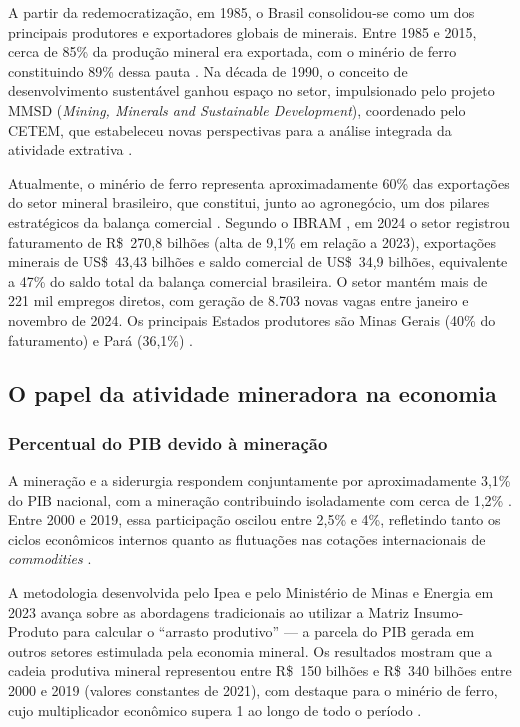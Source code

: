 A partir da redemocratização, em 1985, o Brasil consolidou-se como um dos principais produtores e exportadores globais de minerais. Entre 1985 e 2015, cerca de 85\% da produção mineral era exportada, com o minério de ferro constituindo 89\% dessa pauta \cite{fernandes2016}. Na década de 1990, o conceito de desenvolvimento sustentável ganhou espaço no setor, impulsionado pelo projeto MMSD (\textit{Mining, Minerals and Sustainable Development}), coordenado pelo CETEM, que estabeleceu novas perspectivas para a análise integrada da atividade extrativa \cite{barreto2001}.

Atualmente, o minério de ferro representa aproximadamente 60\% das exportações do setor mineral brasileiro, que constitui, junto ao agronegócio, um dos pilares estratégicos da balança comercial \cite{anm2023}. Segundo o IBRAM \citeyear{ibram2024}, em 2024 o setor registrou faturamento de R\$~270,8 bilhões (alta de 9,1\% em relação a 2023), exportações minerais de US\$~43,43 bilhões e saldo comercial de US\$~34,9 bilhões, equivalente a 47\% do saldo total da balança comercial brasileira. O setor mantém mais de 221 mil empregos diretos, com geração de 8.703 novas vagas entre janeiro e novembro de 2024. Os principais Estados produtores são Minas Gerais (40\% do faturamento) e Pará (36,1\%) \cite{ibram2024}.

\subsection{O papel da atividade mineradora na economia}
\label{subsec:papel_mineracao_economia}

\subsubsection{Percentual do PIB devido à mineração}
\label{subsubsec:percentual_pib}

A mineração e a siderurgia respondem conjuntamente por aproximadamente 3,1\% do PIB nacional, com a mineração contribuindo isoladamente com cerca de 1,2\% \cite{apc2024}. Entre 2000 e 2019, essa participação oscilou entre 2,5\% e 4\%, refletindo tanto os ciclos econômicos internos quanto as flutuações nas cotações internacionais de \textit{commodities} \cite{leao2023, ipea2023, apc2024}.

A metodologia desenvolvida pelo Ipea e pelo Ministério de Minas e Energia em 2023 avança sobre as abordagens tradicionais ao utilizar a Matriz Insumo-Produto para calcular o ``arrasto produtivo'' --- a parcela do PIB gerada em outros setores estimulada pela economia mineral. Os resultados mostram que a cadeia produtiva mineral representou entre R\$~150 bilhões e R\$~340 bilhões entre 2000 e 2019 (valores constantes de 2021), com destaque para o minério de ferro, cujo multiplicador econômico supera 1 ao longo de todo o período \cite{leao2023}.

